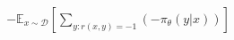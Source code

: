 \documentclass[preview]{standalone}
\begin{document}
\begin{align*}
-\mathbb{E}_{x \sim \mathcal{D}}\left[\sum_{y:r(x,y)=-1}(-\pi_\theta(y|x))\right]
\end{align*}
\end{document}
